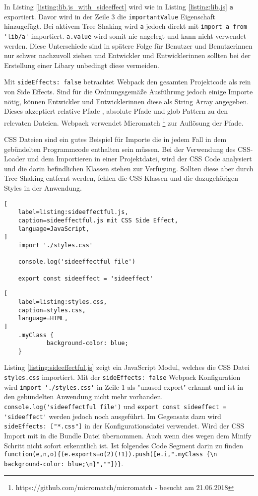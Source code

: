In Listing \ref{listing:lib.js_with_sideeffect} wird wie in Listing \ref{listing:lib.js} \lstinline{a} exportiert. Davor wird in der Zeile 3 die \lstinline{importantValue} Eigenschaft hinzugefügt. Bei aktivem Tree Shaking wird \lstinline{a} jedoch direkt mit \lstinline{import a from 'lib/a'} importiert. \lstinline{a.value} wird somit nie angelegt und kann nicht verwendet werden. Diese Unterschiede sind in spätere Folge für Benutzer und Benutzerinnen nur schwer nachzuvoll ziehen und Entwickler und Entwicklerinnen sollten bei der Erstellung einer Libary unbedingt diese vermeiden.\autocite{WebpackTreeShaking}

Mit \lstinline{sideEffects: false} betrachtet Webpack den gesamten Projektcode als rein von Side Effects. Sind für die Ordnungsgemäße Ausführung jedoch einige Importe nötig, können Entwickler und Entwicklerinnen diese als String Array angegeben. Dieses akzeptiert relative Pfade , absolute Pfade und glob Pattern zu den relevaten Dateien. Webpack verwendet Micromatch \footnote{https://github.com/micromatch/micromatch - besucht am 21.06.2018} zur Auflösung der Pfade.\autocite{WebpackTreeShaking}

CSS Dateien sind ein gutes Beispiel für Importe die in jedem Fall in dem gebündelten Programmcode enthalten sein müssen. Bei der Verwendung des CSS-Loader und dem Importieren in einer Projektdatei, wird der CSS Code analysiert und die darin befindlichen Klassen stehen zur Verfügung. Sollten diese aber durch Tree Shaking entfernt werden, fehlen die CSS Klassen und die dazugehörigen Styles in der Anwendung.
\autocite{WebpackTreeShaking}

\begin{lstlisting}[
    label=listing:sideeffectful.js,
	caption=sideeffectful.js mit CSS Side Effect,
	language=JavaScript,
]
	import './styles.css'

	console.log('sideeffectful file')

	export const sideeffect = 'sideeffect'
\end{lstlisting}

\begin{lstlisting}[
    label=listing:styles.css,
	caption=styles.css,
	language=HTML,
]
	.myClass {
    		background-color: blue;
	}
\end{lstlisting}

Listing \ref{listing:sideeffectful.js} zeigt ein JavaScript Modul, welches die CSS Datei \lstinline{styles.css} importiert. Mit der \lstinline{sideEffects: false} Webpack Konfiguration wird \lstinline{import './styles.css'} in Zeile 1 als "unused export" erkannt und ist in den gebündelten Anwendung nicht mehr vorhanden. \lstinline{console.log('sideeffectful file')} und \lstinline{export const sideeffect = 'sideeffect'} werden jedoch noch ausgeführt.
Im Gegensatz dazu wird \lstinline{sideEffects: ["*.css"]} in der Konfigurationsdatei verwendet. Wird der CSS Import mit in die Bundle Datei übernommen. Auch wenn dies wegen dem Minify Schritt nicht sofort erkenntlich ist. Ist folgendes Code Segment darin zu finden \lstinline|function(e,n,o){(e.exports=o(2)(!1)).push([e.i,".myClass {\n    background-color: blue;\n}",""])}|.\autocite{WebpackTreeShaking}

